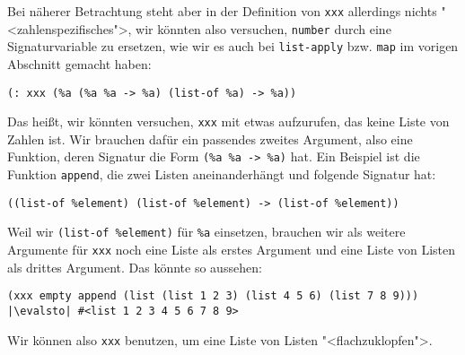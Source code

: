 %
Bei näherer Betrachtung steht aber in der Definition von
\lstinline{xxx} allerdings nichts "<zahlenspezifisches">, wir könnten
also versuchen, \lstinline{number} durch eine Signaturvariable zu
ersetzen, wie wir es auch bei \lstinline{list-apply} bzw. \lstinline{map} im vorigen
Abschnitt gemacht haben:
%
\begin{lstlisting}
(: xxx (%a (%a %a -> %a) (list-of %a) -> %a))
\end{lstlisting}
%
Das heißt, wir könnten versuchen, \lstinline{xxx} mit etwas
aufzurufen, das keine Liste von Zahlen ist.  Wir brauchen dafür ein
passendes zweites Argument, also eine
Funktion, deren Signatur die Form \lstinline{(%a %a -> %a)} hat.  Ein
Beispiel ist die Funktion \lstinline{append}, die zwei Listen
aneinanderhängt und folgende Signatur hat:
%
\begin{lstlisting}
((list-of %element) (list-of %element) -> (list-of %element))
\end{lstlisting}
% 
Weil wir \lstinline{(list-of %element)} für \lstinline{%a} einsetzen,
brauchen wir als weitere Argumente für \lstinline{xxx} noch eine
Liste als erstes Argument und eine Liste von Listen als drittes
Argument.  Das könnte so aussehen:
%
\begin{lstlisting}
(xxx empty append (list (list 1 2 3) (list 4 5 6) (list 7 8 9)))
|\evalsto| #<list 1 2 3 4 5 6 7 8 9>
\end{lstlisting}
%
Wir können also \lstinline{xxx} benutzen, um eine Liste von Listen
"<flachzuklopfen">.

